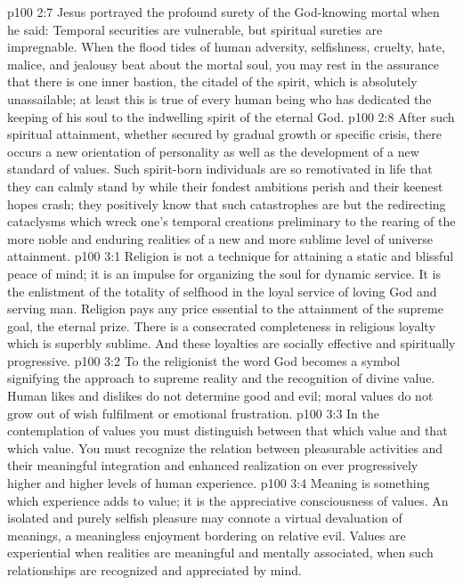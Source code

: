 \vs p100 2:7 Jesus portrayed the profound surety of the God\hyp{}knowing mortal when he said:  Temporal securities are vulnerable, but spiritual sureties are impregnable. When the flood tides of human adversity, selfishness, cruelty, hate, malice, and jealousy beat about the mortal soul, you may rest in the assurance that there is one inner bastion, the citadel of the spirit, which is absolutely unassailable; at least this is true of every human being who has dedicated the keeping of his soul to the indwelling spirit of the eternal God.
\vs p100 2:8 After such spiritual attainment, whether secured by gradual growth or specific crisis, there occurs a new orientation of personality as well as the development of a new standard of values. Such spirit\hyp{}born individuals are so remotivated in life that they can calmly stand by while their fondest ambitions perish and their keenest hopes crash; they positively know that such catastrophes are but the redirecting cataclysms which wreck one’s temporal creations preliminary to the rearing of the more noble and enduring realities of a new and more sublime level of universe attainment.
\vs p100 3:1 Religion is not a technique for attaining a static and blissful peace of mind; it is an impulse for organizing the soul for dynamic service. It is the enlistment of the totality of selfhood in the loyal service of loving God and serving man. Religion pays any price essential to the attainment of the supreme goal, the eternal prize. There is a consecrated completeness in religious loyalty which is superbly sublime. And these loyalties are socially effective and spiritually progressive.
\vs p100 3:2 To the religionist the word God becomes a symbol signifying the approach to supreme reality and the recognition of divine value. Human likes and dislikes do not determine good and evil; moral values do not grow out of wish fulfilment or emotional frustration.
\vs p100 3:3 In the contemplation of values you must distinguish between that which  value and that which  value. You must recognize the relation between pleasurable activities and their meaningful integration and enhanced realization on ever progressively higher and higher levels of human experience.
\vs p100 3:4 \pc Meaning is something which experience adds to value; it is the appreciative consciousness of values. An isolated and purely selfish pleasure may connote a virtual devaluation of meanings, a meaningless enjoyment bordering on relative evil. Values are experiential when realities are meaningful and mentally associated, when such relationships are recognized and appreciated by mind.
